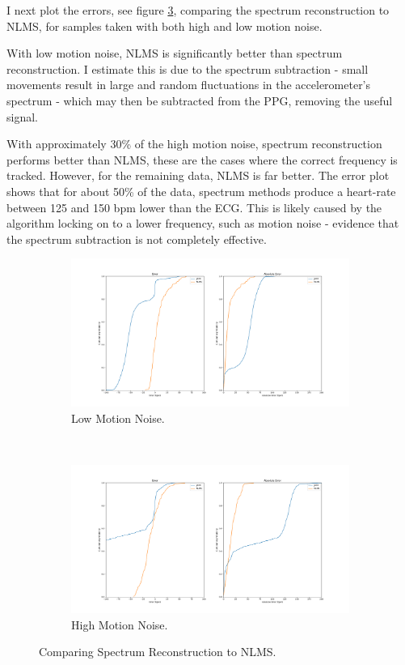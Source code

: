 \documentclass[12pt,a4paper,twoside,openright]{report}
\begin{document}
I next plot the errors, see figure \ref{fig:joss_nlms}, comparing the spectrum
reconstruction to NLMS, for samples taken with both high and low motion noise. 

With low motion noise, NLMS is significantly better than spectrum
reconstruction. I estimate this is due to the spectrum subtraction - small
movements result in large and random fluctuations in the accelerometer's
spectrum - which may then be subtracted from the PPG, removing the useful
signal. 

With approximately 30\% of the high motion noise, spectrum reconstruction
performs better than NLMS, these are the cases where the correct frequency is
tracked. However, for the remaining data, NLMS is far better. The error plot
shows that for about 50\% of the data, spectrum methods produce a heart-rate between
125 and 150 bpm lower than the ECG. This is likely caused by the algorithm
locking on to a lower frequency, such as motion noise - evidence that the
spectrum subtraction is not completely effective.

\begin{figure}[H]
\centering
\begin{subfigure}{.85\textwidth}
  \centering
  \includegraphics[width=\linewidth]{figs/joss_nlms_low.png}
  \caption{Low Motion Noise.}
  \label{fig:joss_nlms_low}
\end{subfigure}
\\
\begin{subfigure}{.85\textwidth}
  \centering
  \includegraphics[width=\linewidth]{figs/joss_nlms_medium.png}
  \caption{High Motion Noise.}
  \label{fig:joss_nlms_medium}
\end{subfigure}
\caption{Comparing Spectrum Reconstruction to NLMS.}
\label{fig:joss_nlms}
\end{figure}
\end{document}
